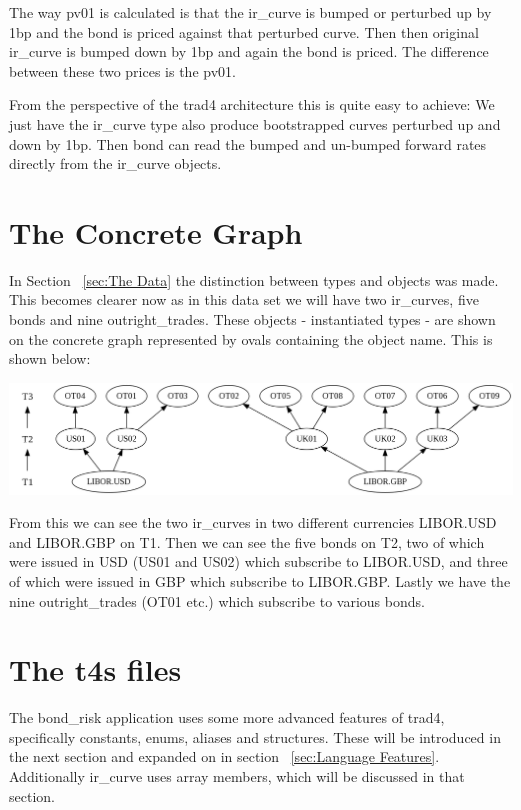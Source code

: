 \documentclass{report}
\begin{document}
The way pv01 is calculated is that the ir_curve is bumped or perturbed up by 1bp and the bond is priced against that perturbed curve. Then then original ir_curve is bumped down by 1bp and again the bond is priced. The difference between these two prices is the pv01.

From the perspective of the trad4 architecture this is quite easy to achieve: We just have the ir_curve type also produce bootstrapped curves perturbed up and down by 1bp. Then bond can read the bumped and un-bumped forward rates directly from the ir_curve objects. 

\section{The Concrete Graph}

In Section ~\ref{sec:The Data} the distinction between types and objects was made. This becomes clearer now as in this data set we will have two ir_curves, five bonds and nine outright_trades. These objects - instantiated types - are shown on the concrete graph represented by ovals containing the object name. This is shown below:

\includegraphics[scale=0.3]{bondriskconcretesmallset.png}

From this we can see the two ir_curves in two different currencies LIBOR.USD and LIBOR.GBP on T1. Then we can see the five bonds on T2, two of which were issued in USD (US01 and US02) which subscribe to LIBOR.USD, and three of which were issued in GBP which subscribe to LIBOR.GBP. Lastly we have the nine outright_trades (OT01 etc.) which subscribe to various bonds.


\section{The t4s files}

The bond_risk application uses some more advanced features of trad4, specifically constants, enums, aliases and structures. These will be introduced in the next section and expanded on in section ~\ref{sec:Language Features}. Additionally ir_curve uses array members, which will be discussed in that section.
\end{document}
